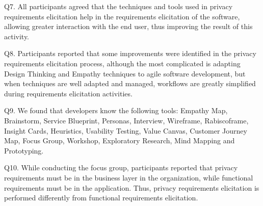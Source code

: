 \documentclass[conference]{IEEEtran}
\begin{document}
Q7. All participants agreed that the techniques and tools used in privacy requirements elicitation help in the requirements elicitation of the software, allowing greater interaction with the end user, thus improving the result of this activity.


Q8. Participants reported that some improvements were identified in the privacy requirements elicitation process, although the most complicated is adapting Design Thinking and Empathy techniques to agile software development, but when techniques are well adapted and managed, workflows are greatly simplified during requirements elicitation activities.


Q9. We found that developers know the following tools: Empathy Map, Brainstorm, Service Blueprint, Personas, Interview, Wireframe, Rabiscoframe, Insight Cards, Heuristics, Usability Testing, Value Canvas, Customer Journey Map, Focus Group, Workshop, Exploratory Research, Mind Mapping and Prototyping.


Q10. While conducting the focus group, participants reported that privacy requirements must be in the business layer in the organization, while functional requirements must be in the application. Thus, privacy requirements elicitation is performed differently from functional requirements elicitation.

\end{document}
